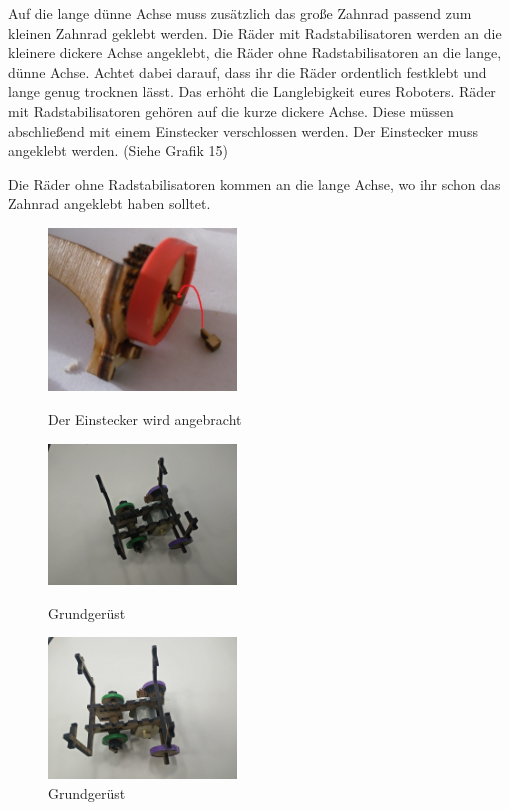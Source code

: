 \documentclass[12pt,a4paper]{article}
\begin{document}
Auf die lange dünne Achse muss zusätzlich das große Zahnrad passend zum kleinen Zahnrad geklebt werden.
Die Räder mit Radstabilisatoren werden an die kleinere dickere Achse angeklebt, die Räder ohne Radstabilisatoren an die lange, dünne Achse. Achtet dabei darauf, dass ihr die Räder ordentlich festklebt und lange genug trocknen lässt. Das erhöht die Langlebigkeit eures Roboters.
Räder mit Radstabilisatoren gehören auf die kurze dickere Achse. Diese müssen abschließend mit einem Einstecker verschlossen werden. Der Einstecker muss angeklebt werden. (Siehe Grafik 15)

Die Räder ohne Radstabilisatoren kommen an die lange Achse, wo ihr schon das Zahnrad angeklebt haben solltet.
\begin{figure}[h]
	\begin{minipage}{0.33\textwidth}
	 \includegraphics[width=5cm]{./graphics/einstecker.jpg}
	\caption{Der Einstecker wird angebracht}
	\end{minipage}
	\begin{minipage}{0.33\textwidth}
	 \includegraphics[width=5cm]{./graphics/Seitlich.jpg}
	\caption{Grundgerüst}
	\end{minipage}
	\begin{minipage}{0.33\textwidth}
	 \includegraphics[width=5cm]{./graphics/schraeg.jpg}
	\caption{Grundgerüst}
	\end{minipage}
	
\end{figure}
\end{document}
